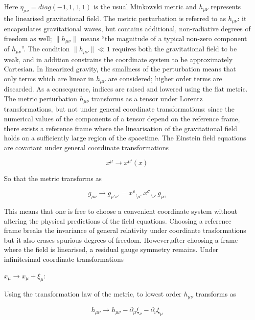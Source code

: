 \documentclass[binding=0.6cm, LaM]{sapthesis}
\begin{document}
	Here $\eta_{\mu\nu} = diag(-1,1,1,1)$ is the usual Minkowski metric and $h_{\mu\nu}$ 
	represents the linearised gravitational field.
	The metric perturbation is referred to as  $h_{\mu\nu}$: it encapsulates gravitational waves, 
	but contains additional, non-radiative degrees of freedom as well; $\|h_{\mu\nu}\|$ means
	“the magnitude of a typical non-zero component of $h_{\mu\nu}$”. 
	The condition $\|h_{\mu\nu}\|\ll 1$ requires both the gravitational field to be weak, 
	and in addition constrains the coordinate system to be approximately Cartesian.  
	In linearized gravity, the smallness of the perturbation means that only terms which are linear in $h_{\mu\nu}$ are considered;
	higher order terms are discarded. As a consequence, indices are raised and lowered using the flat metric.
	The metric perturbation $h_{\mu\nu}$ transforms as a tensor under Lorentz transformations, 
	but not under general coordinate transformations: since the numerical values of the components
	of a tensor depend on the reference frame, there exists a reference frame where 
	the linearisation of the gravitational field holds on a sufficiently large region of the spacetime.
	The Einstein field equations are covariant under general coordinate transformations

		\begin{equation}
		x^{\mu} \rightarrow x^{\mu ‘}(x)
		\end{equation}

	So that the metric transforms as

		\begin{equation}
		g_{\mu\nu} \rightarrow g_{\mu' \nu'} = x^{\rho},_{\mu'}x^{\sigma},_{\nu'}g_{\rho \sigma}
		\end{equation}

	This means that one is free to choose a convenient coordinate system without 
	altering the physical predictions of the field equations.
	Choosing a reference frame breaks the invariance of general relativity under 
	coordiante trasformations but it also erases spurious degrees of freedom.
	However,after choosing a frame where the field is linearised, 
	a residual gauge symmetry remains. Under infinitesimal coordinate transformations
 
		$x_{\mu} \rightarrow x_{\mu} + \xi_{\mu}$:

	Using the transformation law of the metric, to lowest order $h_{\mu\nu}$ transforms as
			
		\[
		h_{\mu\nu} \rightarrow h_{\mu\nu} - \partial_{\mu}\xi_{\nu} - \partial_{\nu}\xi_{\mu}
		\]
\end{document}
